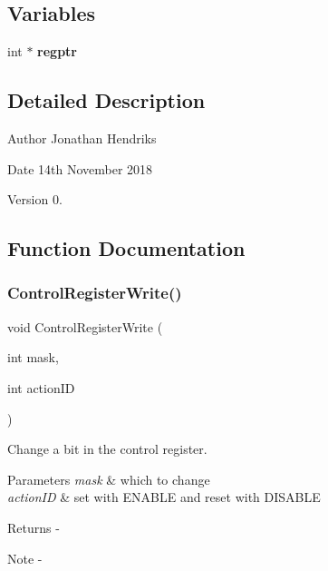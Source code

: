 \subsection*{Variables}
\begin{DoxyCompactItemize}
\item 
\mbox{\label{_t_a_r_g_e_t_c___register_map_8c_a39d2cad95814eb9635cca5310d914893}} 
int $\ast$ {\bfseries regptr}
\end{DoxyCompactItemize}


\subsection{Detailed Description}
\begin{DoxyAuthor}{Author}
Jonathan Hendriks 
\end{DoxyAuthor}
\begin{DoxyDate}{Date}
14th November 2018 
\end{DoxyDate}
\begin{DoxyVersion}{Version}
0. 
\end{DoxyVersion}


\subsection{Function Documentation}
\mbox{\label{_t_a_r_g_e_t_c___register_map_8c_ab78e8b74db0db6f7923e5e5b4d07cb9a}} 
\subsubsection{ControlRegisterWrite()}
{\footnotesize\ttfamily void Control\+Register\+Write (\begin{DoxyParamCaption}\item[{int}]{mask,  }\item[{int}]{action\+ID }\end{DoxyParamCaption})}



Change a bit in the control register. 


\begin{DoxyParams}{Parameters}
{\em mask} & which to change \\
\hline
{\em action\+ID} & set with E\+N\+A\+B\+LE and reset with D\+I\+S\+A\+B\+LE\\
\hline
\end{DoxyParams}
\begin{DoxyReturn}{Returns}
-\/
\end{DoxyReturn}
\begin{DoxyNote}{Note}
-\/ 
\end{DoxyNote}
\mbox{\label{_t_a_r_g_e_t_c___register_map_8c_a94d4774c370e66c8f467fb25ba84ac0e}} 
